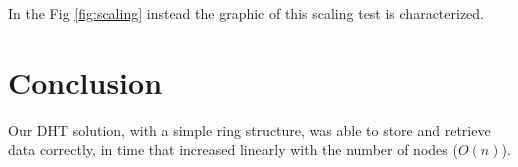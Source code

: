 \documentclass[11pt,conference]{IEEEtran}
\begin{document}
In the Fig \ref{fig:scaling} instead the graphic of this scaling test is characterized.




\section{Conclusion}

Our DHT solution, with a simple ring structure, was able to store and retrieve
data correctly, in time that increased linearly with the number of nodes
($O(n)$).




\end{document}
